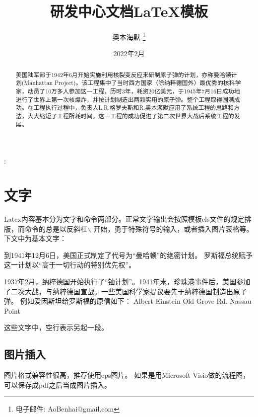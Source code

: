 \documentclass[a4paper, 10pt]{AvicReport}
\begin{document}
\title{研发中心文档\LaTeX 模板 }

\author{奥本海默
\footnote{电子邮件: AoBenhai@gmail.com}\\[4ex]
}
\date{2022年2月}




\maketitle

\newpage
\begin{abstract}
美国陆军部于1942年6月开始实施利用核裂变反应来研制原子弹的计划，亦称曼哈顿计划(Manhattan Project)。该工程集中了当时西方国家（除纳粹德国外）最优秀的核科学家，动员了10万多人参加这一工程，历时3年，耗资20亿美元，于1945年7月16日成功地进行了世界上第一次核爆炸，并按计划制造出两颗实用的原子弹。整个工程取得圆满成功。在工程执行过程中，负责人L.R.格罗夫斯和R.奥本海默应用了系统工程的思路和方法，大大缩短了工程所耗时间。这一工程的成功促进了第二次世界大战后系统工程的发展。
\end{abstract}

{\hei\sihao {}:} \avicitCKeyword

\newpage
\begin{center}
\tableofcontents
\end{center}
\newpage

\section{文字}
Latex内容基本分为文字和命令两部分。正常文字输出会按照模板cls文件的规定排版，而命令的总是以反斜杠$\backslash$ 开始，勇于特殊符号的输入，或者插入图片表格等。下文中为基本文字： 

到1941年12月6日，美国正式制定了代号为“曼哈顿”的绝密计划。 罗斯福总统赋予这一计划以“高于一切行动的特别优先权”。

1937年2月，纳粹德国开始执行了“铀计划”。1941年末，珍珠港事件后，美国参加了二次大战，与纳粹德国宣战。一些美国科学家提议要先于纳粹德国制造出原子弹。
例如爱因斯坦给罗斯福的原信如下：
Albert Einstein
Old Grove Rd.
Nassau Point

这些文字中，空行表示另起一段。



\subsection{图片插入}
图片格式兼容性很高，推荐使用eps图片。 如果是用Microsoft Visio做的流程图，可以保存成pdf之后当成图片插入。
\end{document}
